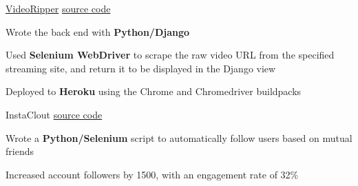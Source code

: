 \begin{cventries}
  \cventry
    {\fontsize{10pt}{1em}\bodyfont\upshape\color{text}{Fetches and plays back the raw video from a streaming site}} %
    {\href{https://videoripper.herokuapp.com/}{VideoRipper}} %
    {\href{https://github.com/tacticaltofu/videoripper}{source code}} %
    {} %
    {
      \begin{cvitems} %
        \item {Wrote the back end with \textbf{Python/Django}}
        \item {Used \textbf{Selenium WebDriver} to scrape the raw video URL from the specified streaming site, and return it to be displayed in the Django view}
        \item {Deployed to \textbf{Heroku} using the Chrome and Chromedriver buildpacks}
      \end{cvitems}
    }
    
  \cventry
    {\fontsize{10pt}{1em}\bodyfont\upshape\color{text}{Instagram bot for gaining real followers}} %
    {InstaClout} %
    {\href{https://github.com/tacticaltofu/InstaClout}{source code}} %
    {} %
    {
      \begin{cvitems} %
        \item {Wrote a \textbf{Python/Selenium} script to automatically follow users based on mutual friends}
        \item {Increased account followers by 1500, with an engagement rate of 32\%}
      \end{cvitems}
    }
\end{cventries}
